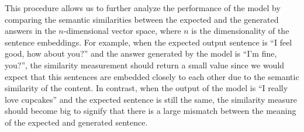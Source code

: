 This procedure allows us to further analyze the performance of the model by comparing the semantic similarities between the expected and the generated answers in the $n$-dimensional vector space, where $n$ is the dimensionality of the sentence embeddings. For example, when the expected output sentence is ``I feel good, how about you?'' and the answer generated by the model is ``I'm fine, you?'', the similarity measurement should return a small value since we would expect that this sentences are embedded closely to each other due to the semantic similarity of the content. In contrast, when the output of the model is ``I really love cupcakes'' and the expected sentence is still the same, the similarity measure should become big to signify that there is a large mismatch between the meaning of the expected and generated sentence.

